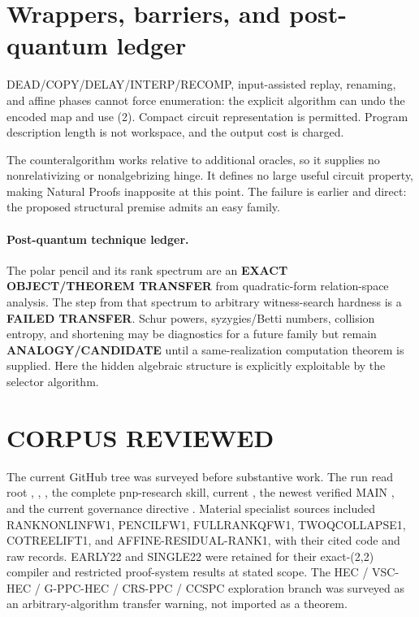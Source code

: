 \documentclass[11pt]{article}
\begin{document}
\section{Wrappers, barriers, and post-quantum ledger}
DEAD/COPY/DELAY/INTERP/RECOMP, input-assisted replay, renaming, and affine
phases cannot force enumeration: the explicit algorithm can undo the encoded
map and use (2).  Compact circuit representation is permitted.  Program
description length is not workspace, and the output cost is charged.

The counteralgorithm works relative to additional oracles, so it supplies no
nonrelativizing or nonalgebrizing hinge.  It defines no large useful circuit
property, making Natural Proofs inapposite at this point.  The failure is
earlier and direct: the proposed structural premise admits an easy family.

\paragraph{Post-quantum technique ledger.}
The polar pencil and its rank spectrum are an \textbf{EXACT OBJECT/THEOREM
TRANSFER} from quadratic-form relation-space analysis.  The step from that
spectrum to arbitrary witness-search hardness is a \textbf{FAILED TRANSFER}.
Schur powers, syzygies/Betti numbers, collision entropy, and shortening may be
diagnostics for a future family but remain \textbf{ANALOGY/CANDIDATE} until a
same-realization computation theorem is supplied.  Here the hidden algebraic
structure is explicitly exploitable by the selector algorithm.

\section{CORPUS REVIEWED}
The current GitHub tree was surveyed before substantive work.  The run read
root , , , the complete
pnp-research skill, current , the newest verified MAIN
, and the current
governance directive
.
Material specialist sources included RANKNONLINFW1, PENCILFW1, FULLRANKQFW1,
TWOQCOLLAPSE1, COTREELIFT1, and AFFINE-RESIDUAL-RANK1, with their cited code
and raw records.  EARLY22 and SINGLE22 were retained for their exact-(2,2)
compiler and restricted proof-system results at stated scope.  The HEC /
VSC-HEC / G-PPC-HEC / CRS-PPC / CCSPC exploration branch was surveyed as an
arbitrary-algorithm transfer warning, not imported as a theorem.
\end{document}
